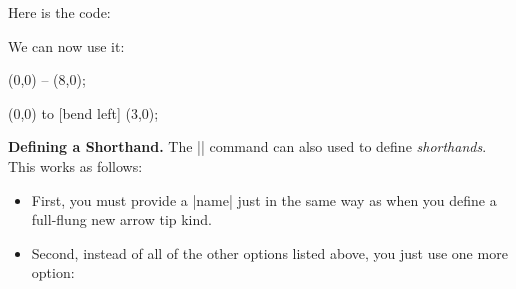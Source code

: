 \begin{command}{\pgfdeclarearrow{}}
  Here is the code:
\begin{codeexample}
\end{codeexample}
  We can now use it:
\begin{codeexample}[]
\tikz \draw [-foo] (0,0) -- (8,0);    
\end{codeexample}
\begin{codeexample}[]
\tikz \draw [-{foo[length=2cm,bend]}] (0,0) to [bend left] (3,0);    
\end{codeexample}

  \medskip
  \noindent\textbf{Defining a Shorthand.}  
  The |\pgfdeclarearrow| command can also used to define
  \emph{shorthands}. This works as follows:
  \begin{itemize}
  \item First, you must provide a |name| just in the same way as when
    you define a full-flung new arrow tip kind.
  \item Second, instead of all of the other options listed above, you
    just use one more option:
    

\end{itemize}
\end{command}
